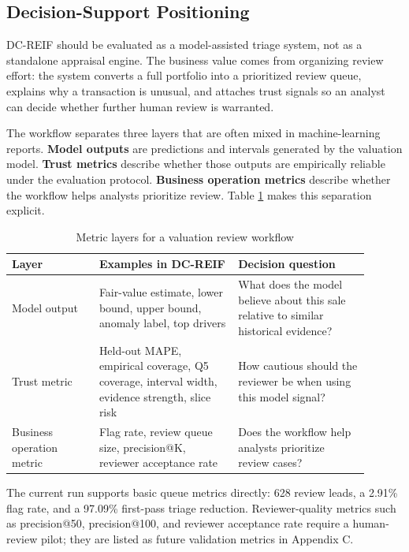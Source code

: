 \documentclass[12pt,a4paper]{article}
\begin{document}
\subsection{Decision-Support Positioning}
DC-REIF should be evaluated as a model-assisted triage system, not as a standalone appraisal engine. The business value comes from organizing review effort: the system converts a full portfolio into a prioritized review queue, explains why a transaction is unusual, and attaches trust signals so an analyst can decide whether further human review is warranted.

The workflow separates three layers that are often mixed in machine-learning reports. \textbf{Model outputs} are predictions and intervals generated by the valuation model. \textbf{Trust metrics} describe whether those outputs are empirically reliable under the evaluation protocol. \textbf{Business operation metrics} describe whether the workflow helps analysts prioritize review. Table \ref{tab:metric_layers} makes this separation explicit.

\begin{table}[H]
\centering
\caption{Metric layers for a valuation review workflow}
\label{tab:metric_layers}
\begin{tabular}{p{0.22\linewidth}p{0.35\linewidth}p{0.33\linewidth}}
\toprule
\textbf{Layer} & \textbf{Examples in DC-REIF} & \textbf{Decision question}\\
\midrule
Model output & Fair-value estimate, lower bound, upper bound, anomaly label, top drivers & What does the model believe about this sale relative to similar historical evidence?\\
Trust metric & Held-out MAPE, empirical coverage, Q5 coverage, interval width, evidence strength, slice risk & How cautious should the reviewer be when using this model signal?\\
Business operation metric & Flag rate, review queue size, precision@K, reviewer acceptance rate & Does the workflow help analysts prioritize review cases?\\
\bottomrule
\end{tabular}
\end{table}

The current run supports basic queue metrics directly: 628 review leads, a 2.91\% flag rate, and a 97.09\% first-pass triage reduction. Reviewer-quality metrics such as precision@50, precision@100, and reviewer acceptance rate require a human-review pilot; they are listed as future validation metrics in Appendix C.
\end{document}
